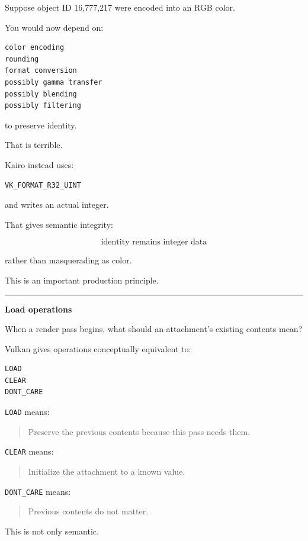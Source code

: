 Suppose object ID 16,777,217 were encoded into an RGB color.

You would now depend on:

\begin{verbatim}
color encoding
rounding
format conversion
possibly gamma transfer
possibly blending
possibly filtering
\end{verbatim}

to preserve identity.

That is terrible.

Kairo instead uses:

\begin{verbatim}
VK_FORMAT_R32_UINT
\end{verbatim}

and writes an actual integer.

That gives semantic integrity:

\[
\boxed{\text{identity remains integer data}}
\]

rather than masquerading as color.

This is an important production principle.

\begin{center}\rule{0.5\linewidth}{0.5pt}\end{center}

\textbf{Load operations}

When a render pass begins, what should an attachment's existing contents mean?

Vulkan gives operations conceptually equivalent to:

\begin{verbatim}
LOAD
CLEAR
DONT_CARE
\end{verbatim}

\texttt{LOAD} means:

\begin{quote}
Preserve the previous contents because this pass needs them.
\end{quote}

\texttt{CLEAR} means:

\begin{quote}
Initialize the attachment to a known value.
\end{quote}

\texttt{DONT\_CARE} means:

\begin{quote}
Previous contents do not matter.
\end{quote}

This is not only semantic.

